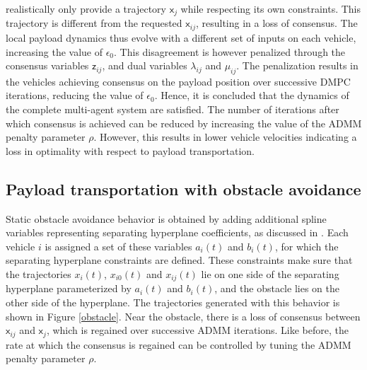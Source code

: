 \documentclass[letterpaper, 10 pt, conference]{ieeeconf}
\newcommand{\cx}{\textsf{x}}
\newcommand{\cz}{\textsf{z}}
\begin{document}
 realistically only provide a trajectory $\cx_j$ while respecting its own constraints. This trajectory is different from the requested $\cx_{ij}$, resulting in a loss of consensus. The local payload dynamics thus evolve with a different set of inputs on each vehicle, increasing the value of $\epsilon_0$. This disagreement is however penalized through the consensus variables $\cz_{ij}$, and dual variables $\lambda_{ij}$ and $\mu_{ij}$. The penalization results in the vehicles achieving consensus on the payload position over successive DMPC iterations, reducing the value of $\epsilon_0$. Hence, it is concluded that the dynamics of the complete multi-agent system are satisfied. The number of iterations after which consensus is achieved can be reduced by increasing the value of the ADMM penalty parameter $\rho$. However, this results in lower vehicle velocities indicating a loss in optimality with respect to payload transportation.
 \\
 \indent
 \subsection{Payload transportation with obstacle avoidance}
Static obstacle avoidance behavior is obtained by adding additional spline variables representing separating hyperplane coefficients, as discussed in \cite{c15}. Each vehicle $i$ is assigned a set of these variables $a_i(t)$ and $b_i(t)$, for which the separating hyperplane constraints are defined. These constraints make sure that the trajectories $x_i(t)$, $x_{i0}(t)$ and $x_{ij}(t)$ lie on one side of the separating hyperplane parameterized by $a_i(t)$ and $b_i(t)$, and the obstacle lies on the other side of the hyperplane. The trajectories generated with this behavior is shown in Figure \ref{obstacle}. Near the obstacle, there is a loss of consensus between $\cx_{ij}$ and $\cx_{j}$, which is regained over successive ADMM iterations. Like before, the rate at which the consensus is regained can be controlled by tuning the ADMM penalty parameter $\rho$.
 
\end{document}

